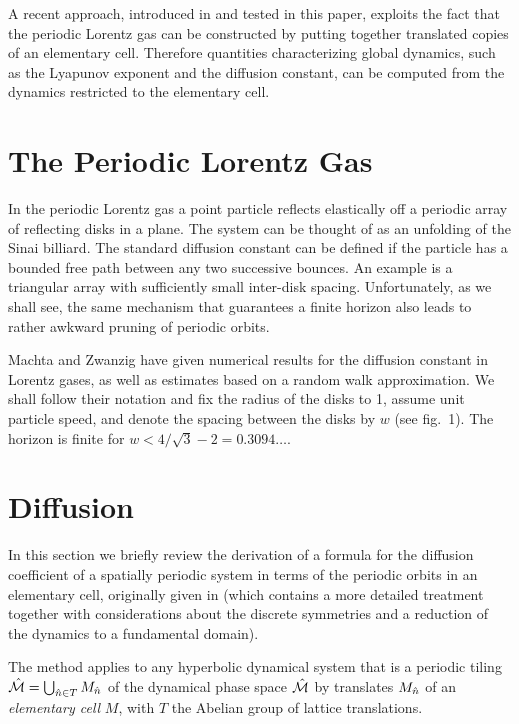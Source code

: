 A recent approach, introduced in  and
tested in this paper, exploits the fact that the periodic Lorentz
gas
can be constructed by putting together
translated copies of an elementary cell.
Therefore quantities characterizing global dynamics, such as
the Lyapunov exponent and the diffusion constant, can be
computed from the dynamics restricted to the elementary cell.

\section{The Periodic Lorentz Gas}
In the periodic Lorentz gas
a point particle reflects elastically off
a periodic array of reflecting disks in a plane.
The system can
be thought of as an unfolding of the Sinai billiard.
The standard diffusion constant can be defined if the particle has a bounded
free path between any two successive bounces.
An example is a triangular array with sufficiently small
inter-disk spacing.
Unfortunately, as we shall see,
the same mechanism that guarantees a finite horizon
also leads to rather awkward pruning of periodic orbits.


Machta and Zwanzig have given numerical results
for the diffusion constant in Lorentz gases,  as well as
estimates based on a random walk approximation. We shall follow
their notation and fix the radius of the disks to 1,
assume unit particle speed, and
denote the spacing between the disks by $w$ (see fig.~1).
The horizon is finite for $w < 4/\sqrt{3}-2 = 0.3094\dots$.

\section{Diffusion}
In this section we briefly review the
derivation of a formula for the diffusion coefficient
of a spatially periodic system in terms of the periodic orbits in an elementary
cell, originally given in  (which contains
a more detailed treatment together with considerations about the
discrete symmetries and a reduction of the dynamics to a fundamental domain).

The method applies to any  hyperbolic dynamical system that is a periodic
tiling $\hat {{\cal M}}=\bigcup_{ \hat n \in T} M_{\hat n}$ of the dynamical phase space $\hat {{\cal M}}$
by translates $M_{\hat n}$ of an {\sl elementary cell} $M$, with $T$ the
Abelian group of lattice translations.

